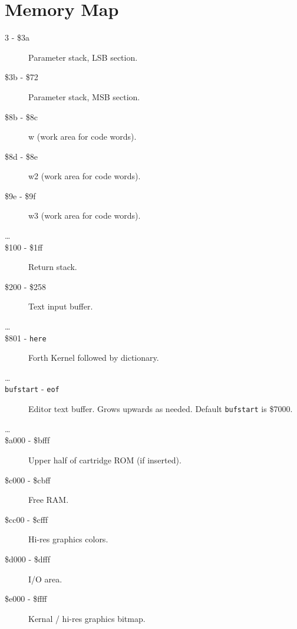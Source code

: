 \chapter{Memory Map}

\begin{description}
\item[3 - \$3a] Parameter stack, LSB section.
\item[\$3b - \$72] Parameter stack, MSB section.
\item[\$8b - \$8c] w (work area for code words).
\item[\$8d - \$8e] w2 (work area for code words).
\item[\$9e - \$9f] w3 (work area for code words).
\item[\ldots]
\item[\$100 - \$1ff] Return stack.
\item[\$200 - \$258] Text input buffer.
\item[\ldots]
\item[\$801 - \texttt{here}] Forth Kernel followed by dictionary.
\item[\ldots]
\item[\texttt{bufstart} - \texttt{eof}] Editor text buffer. Grows upwards as needed. Default \texttt{bufstart} is \$7000.
\item[\ldots]
\item[\$a000 - \$bfff] Upper half of cartridge ROM (if inserted).
\item[\$c000 - \$cbff] Free RAM.
\item[\$cc00 - \$cfff] Hi-res graphics colors.
\item[\$d000 - \$dfff] I/O area. 
\item[\$e000 - \$ffff] Kernal / hi-res graphics bitmap.

\end{description}

